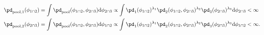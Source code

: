 \begin{align}
  \pd_{\text{pool}, 1} (\phi_{1 \cap 2}) &= 
    \int \pd_{\text{pool}} (\phi_{1 \cap 2}, \phi_{2 \cap 3}) \text{d}\phi_{2 \cap 3} 
    \propto
    \int 
      \pd_{1}(\phi_{1 \cap 2})^{\lambda_{1}}
      \pd_{2}(\phi_{1 \cap 2}, \phi_{2 \cap 3})^{\lambda_{2}}
      \pd_{3}(\phi_{2 \cap 3})^{\lambda_{3}}
    \text{d}\phi_{2 \cap 3} 
    < \infty
    \\
  \pd_{\text{pool}, 2} (\phi_{2 \cap 3}) &= 
    \int \pd_{\text{pool}} (\phi_{1 \cap 2}, \phi_{2 \cap 3}) \text{d}\phi_{1 \cap 2} 
    \propto
    \int 
      \pd_{1}(\phi_{1 \cap 2})^{\lambda_{1}}
      \pd_{2}(\phi_{1 \cap 2}, \phi_{2 \cap 3})^{\lambda_{2}}
      \pd_{3}(\phi_{2 \cap 3})^{\lambda_{3}}
    \text{d}\phi_{1 \cap 2}
    < \infty.
  \label{eqn:pooled-marginals}
\end{align}